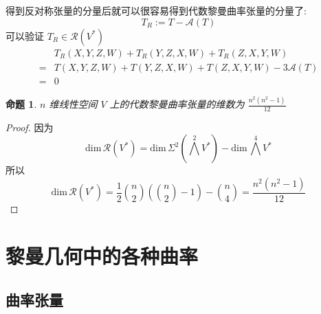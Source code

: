 \documentclass{book}
\newtheorem{proposition}[theorem]{\indent 命题}
\begin{document}
        得到反对称张量的分量后就可以很容易得到代数黎曼曲率张量的分量了:
        \begin{equation*}
            T_R := T - \mathcal{A}(T)
        \end{equation*}
        可以验证 $T_R\in\mathcal{R}(V^*)$
        \begin{align*}
            & T_R(X,Y,Z,W) + T_R(Y,Z,X,W) + T_R(Z,X,Y,W) \\
            =& T(X,Y,Z,W) + T(Y,Z,X,W) + T(Z,X,Y,W) - 3\mathcal{A}(T) \\
            =& 0
        \end{align*}

        \begin{proposition}
            $n$ 维线性空间 $V$ 上的代数黎曼曲率张量的维数为 $\displaystyle \frac{n^2(n^2-1)}{12}$
        \end{proposition}
        \begin{proof}
            因为
            \begin{equation*}
                \textstyle \mathrm{dim}\,\mathcal{R}(V^*) = \mathrm{dim}\,\Sigma^2(\bigwedge^2V^*) - \mathrm{dim}\,\bigwedge^4V^*
            \end{equation*}
            所以
            \begin{equation*}
                \mathrm{dim}\,\mathcal{R}(V^*) = \frac{1}{2}\binom{n}{2}\left(\binom{n}{2} - 1\right)-\binom{n}{4} = \frac{n^2(n^2-1)}{12}
            \end{equation*}
        \end{proof}

    \section{黎曼几何中的各种曲率}
    \subsection{曲率张量}
\end{document}

